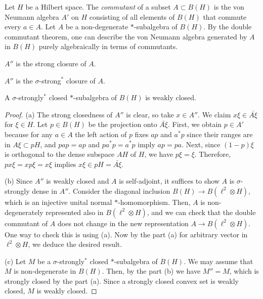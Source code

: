 \documentclass{../../large}
\begin{document}
\begin{prb}
Let $H$ be a Hilbert space.
The \emph{commutant} of a subset $A\subset B(H)$ is the von Neumann algebra $A'$ on $H$ consisting of all elements of $B(H)$ that commute every $a\in A$.
Let $A$ be a non-degenerate $*$-subalgebra of $B(H)$.
By the double commutant theorem, one can describe the von Neumann algebra generated by $A$ in $B(H)$ purely algebraically in terms of commutants.
\begin{parts}
\item $A''$ is the strong closure of $A$.
\item $A''$ is the $\sigma$-strong$^*$ closure of $A$.
\item A $\sigma$-strongly$^*$ closed $*$-subalgebra of $B(H)$ is weakly closed.
\end{parts}
\end{prb}
\begin{proof}
(a)
The strong closedness of $A''$ is clear, so take $x\in A''$.
We claim $x\xi\in\bar{A\xi}$ for $\xi\in H$.
Let $p\in B(H)$ be the projection onto $\bar{A\xi}$.
First, we obtain $p\in A'$ because for any $a\in A$ the left action of $p$ fixes $ap$ and $a^*p$ since their ranges are in $A\xi\subset pH$, and $pap=ap$ and $pa^*p=a^*p$ imply $ap=pa$.
Next, since $(1-p)\xi$ is orthogonal to the dense subspace $AH$ of $H$, we have $p\xi=\xi$.
Therefore, $px\xi=xp\xi=x\xi$ implies $x\xi\in pH=\bar{A\xi}$.

(b)
Since $A''$ is weakly closed and $A$ is self-adjoint, it suffices to show $A$ is $\sigma$-strongly dense in $A''$.
Consider the diagonal inclusion $B(H)\to B(\ell^2\otimes H)$, which is an injective unital normal $*$-homomorphism.
Then, $A$ is non-degenerately represented also in $B(\ell^2\otimes H)$, and we can check that the double commutant of $A$ does not change in the new representation $A\to B(\ell^2\otimes H)$.
One way to check this is using (a).
Now by the part (a) for arbitrary vector in $\ell^2\otimes H$, we deduce the desired result.

(c)
Let $M$ be a $\sigma$-strongly$^*$ closed $*$-subalgebra of $B(H)$.
We may assume that $M$ is non-degenerate in $B(H)$.
Then, by the part (b) we have $M''=M$, which is strongly closed by the part (a).
Since a strongly closed convex set is weakly closed, $M$ is weakly closed.
\end{proof}
\end{document}
